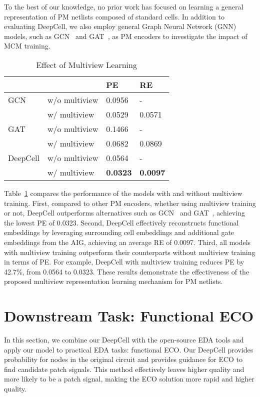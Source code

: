 To the best of our knowledge, no prior work has focused on learning a general representation of PM netlists composed of standard cells. In addition to evaluating DeepCell, we also employ general Graph Neural Network (GNN) models, such as GCN~\cite{kipf2016semi} and GAT~\cite{velivckovic2017graph}, as PM encoders to investigate the impact of MCM training. 

\begin{table}[!t]
\caption{Effect of Multiview Learning} \label{TAB:multiview}
\vspace{-5pt}
\centering
\begin{tabular}{@{}llll@{}}
\toprule
         &               & PE              & RE              \\ \midrule
GCN~\cite{kipf2016semi}      & w/o multiview & 0.0956          & -               \\
         & w/ multiview  & 0.0529          & 0.0571          \\ \midrule
GAT~\cite{velivckovic2017graph}      & w/o multiview & 0.1466          & -               \\
         & w/ multiview  & 0.0682          & 0.0869          \\ \midrule
DeepCell & w/o multiview & 0.0564          & -               \\
         & w/ multiview  & \textbf{0.0323} & \textbf{0.0097} \\ \bottomrule
\end{tabular}
\vspace{-15pt}
\end{table}

Table~\ref{TAB:multiview} compares the performance of the models with and without multiview training. First, compared to other PM encoders, whether using multiview training or not, DeepCell outperforms alternatives such as GCN~\cite{kipf2016semi} and GAT~\cite{velivckovic2017graph}, achieving the lowest PE of 0.0323. Second, DeepCell effectively reconstructs functional embeddings by leveraging surrounding cell embeddings and additional gate embeddings from the AIG, achieving an average RE of 0.0097. Third, all models with multiview training outperform their counterparts without multiview training in terms of PE. For example, DeepCell with multiview training reduces PE by 42.7\%, from 0.0564 to 0.0323. These results demonstrate the effectiveness of the proposed multiview representation learning mechanism for PM netlists.

\section{Downstream Task: Functional ECO} \label{Sec:downstream task}
In this section, we combine our DeepCell with the open-source EDA tools and apply our model to practical EDA tasks:
functional ECO. Our DeepCell provides probability for nodes in the original circuit and provides guidance for ECO to find candidate patch signals. This method effectively leaves higher quality and more likely to be a patch signal, making the ECO solution more rapid and higher quality.

